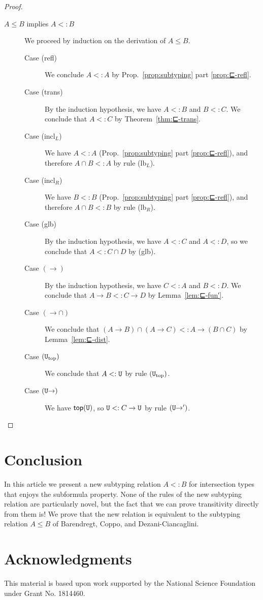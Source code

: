 \documentclass{article}
\begin{document}
\begin{proof}
\begin{description}
  \item[$A \leq B$ implies $A <: B$]
    We proceed by induction on the derivation of $A \leq B$.
    \begin{description}
    \item[Case (refl)] We conclude $A <: A$ by Prop.~\ref{prop:subtyping}
      part \ref{prop:⊑-refl}.
    \item[Case (trans)]
      By the induction hypothesis, we have $A <: B$ and $B <: C$.
      We conclude that $A <: C$ by Theorem~\ref{thm:⊑-trans}.
    \item[Case (incl$_L$)] We have $A <: A$
      (Prop.~\ref{prop:subtyping} part \ref{prop:⊑-refl}),
      and therefore $A \cap B <: A$ by rule (lb$_L$).
    \item[Case (incl$_R$)] We have $B <: B$
      (Prop.~\ref{prop:subtyping} part \ref{prop:⊑-refl}),
      and therefore $A \cap B <: B$ by rule (lb$_R$).
    \item[Case (glb)] By the induction hypothesis, we have
      $A <: C$ and $A <: D$, so we conclude that $A <: C \cap D$ by (glb).
    \item[Case $(\to)$] By the induction hypothesis, we have $C <: A$
      and $B <: D$. We conclude that $A \to B <: C \to D$
      by Lemma~\ref{lem:⊑-fun′}.
    \item[Case $({\to}{\cap})$] We conclude that
      $(A \to B) \cap (A \to C) <: A \to (B \cap C)$
      by Lemma~\ref{lem:⊑-dist}.
    \item[Case $(\mathtt{U}_{\mathrm{top}})$]
      We conclude that $A <: \mathtt{U}$ by rule $(\mathtt{U}_{\mathrm{top}})$.
    \item[Case $(\mathtt{U}{\to})$]
      We have $\mathsf{top}(\mathtt{U})$, so $\mathtt{U} <: C \to \mathtt{U}$ by rule $(\mathtt{U}{\to}')$.
    \end{description}
    
  \end{description}
\end{proof}

\section{Conclusion}
\label{sec:conclude}

In this article we present a new subtyping relation $A <: B$ for
intersection types that enjoys the subformula property.  None of the
rules of the new subtyping relation are particularly novel, but the
fact that we can prove transitivity directly from them is!  We prove
that the new relation is equivalent to the subtyping relation $A \leq B$
of Barendregt, Coppo, and Dezani-Ciancaglini.


\section*{Acknowledgments}

This material is based upon work supported by the National Science
Foundation under Grant No. 1814460.

\pagebreak



\end{document}
